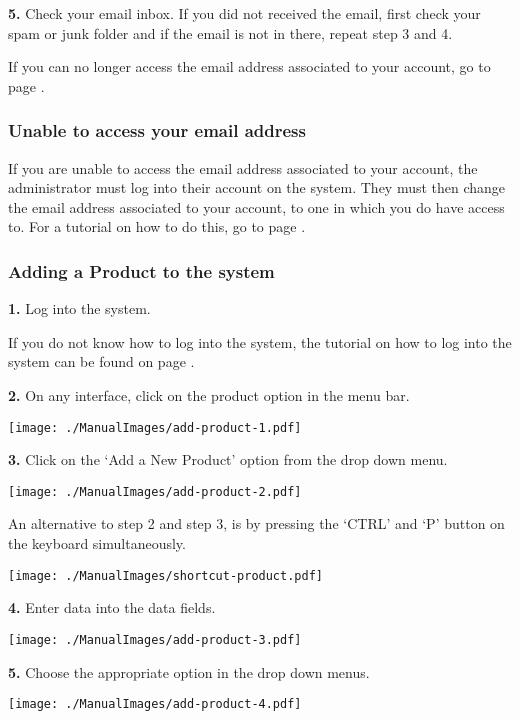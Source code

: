 \textbf{5.} Check your email inbox. If you did not received the email, first check your spam or junk folder and if the email is not in there, repeat step 3 and 4.

If you can no longer access the email address associated to your account, go to page \pageref{fig:Unable to access your email address}.

\pagebreak
\subsubsection{Unable to access your email address}
\label{fig:Unable to access your email address}

If you are unable to access the email address associated to your account, the administrator must log into their account on the system. They must then change the email address associated to your account, to one in which you do have access to. For a tutorial on how to do this, go to page .

\pagebreak
\subsubsection{Adding a Product to the system}
\label{fig:Adding a Product to the system}

\textbf{1.} Log into the system.

If you do not know how to log into the system, the tutorial on how to log into the system can be found on page \pageref{fig:Logging into the system}.

\textbf{2.} On any interface, click on the product option in the menu bar.

\texttt{[image: ./ManualImages/add-product-1.pdf]}

\textbf{3.} Click on the `Add a New Product' option from the drop down menu.

\texttt{[image: ./ManualImages/add-product-2.pdf]}

An alternative to step 2 and step 3, is by pressing the `CTRL' and `P' button on the keyboard simultaneously.

\texttt{[image: ./ManualImages/shortcut-product.pdf]}

\textbf{4. }Enter data into the data fields.

\texttt{[image: ./ManualImages/add-product-3.pdf]}

\textbf{5.} Choose the appropriate option in the drop down menus.

\texttt{[image: ./ManualImages/add-product-4.pdf]}

